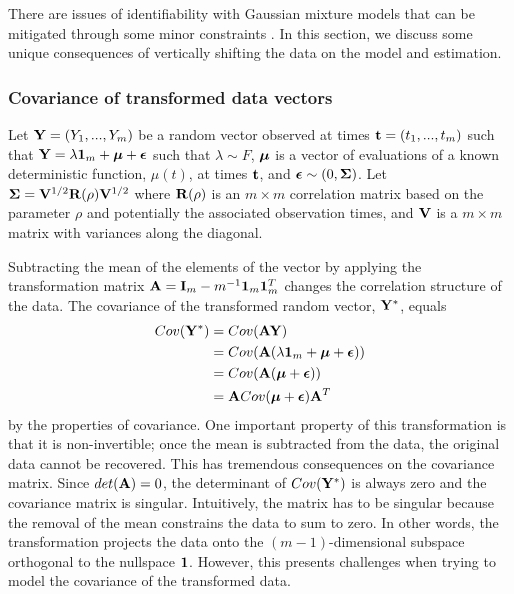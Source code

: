 There are issues of identifiability with Gaussian mixture models that can be mitigated through some minor constraints \cite{mclachlan2000}. In this section, we discuss some unique consequences of vertically shifting the data on the model and estimation.

\subsubsection{Covariance of transformed data vectors}
Let $\mathbf Y=(Y_{1},...,Y_{m})$ be a random vector observed at times $\mathbf t=(t_{1},...,t_{m})$ such that
$\mathbf Y = \lambda\mathbf 1_{m} + \boldsymbol\mu + \boldsymbol\epsilon$
such that $\lambda\sim F$, $\boldsymbol\mu$ is a vector of evaluations of a known deterministic function, $\mu(t)$, at times $\mathbf t$, and $\boldsymbol\epsilon\sim(0,\boldsymbol\Sigma)$. Let $\mathbf\Sigma =\mathbf V^{1/2}\mathbf R(\rho)\mathbf V^{1/2}$ where $\mathbf R(\rho)$ is an $m\times m$ correlation matrix based on the parameter $\rho$ and potentially the associated observation times, and $\mathbf V$ is a $m\times m$ matrix with variances along the diagonal. 

Subtracting the mean of the elements of the vector by applying the transformation matrix $\mathbf A = \mathbf I_{m}-m^{-1}\mathbf 1_{m}\mathbf 1_{m}^{T}$ changes the correlation structure of the data. The covariance of the transformed random vector, $\mathbf Y^{*}$, equals
\begin{align*}
Cov(\mathbf Y^{*})&=Cov(\mathbf A\mathbf Y)\\
&=Cov( \mathbf A(\lambda\mathbf 1_{m}+ \boldsymbol\mu + \boldsymbol\epsilon))\\
&=Cov( \mathbf A( \boldsymbol\mu + \boldsymbol\epsilon))\\
&= \mathbf ACov( \boldsymbol\mu + \boldsymbol\epsilon)\mathbf A^{T}
\end{align*}
by the properties of covariance. One important property of this transformation is that it is non-invertible; once the mean is subtracted from the data, the original data cannot be recovered. This has tremendous consequences on the covariance matrix. Since $det(\mathbf A) = 0$, the determinant of $Cov(\mathbf Y^{*})$ is always zero and the covariance matrix is singular. Intuitively, the matrix has to be singular because the removal of the mean constrains the data to sum to zero. In other words, the transformation projects the data onto the $(m-1)$-dimensional subspace orthogonal to the nullspace $\mathbf 1$. However, this presents challenges when trying to model the covariance of the transformed data. 

